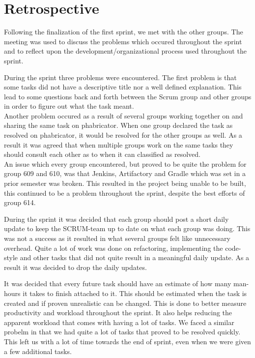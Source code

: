 \section{Retrospective}
Following the finalization of the first sprint, we met with the other
groups. The meeting was used to discuss the problems which occured
throughout the sprint and to reflect upon the development/organizational
process used throughout the sprint.\nl

During the sprint three problems were encountered. The first problem is that
some tasks did not have a descriptive title nor a well defined explanation.
This lead to some questions back and forth between the Scrum group and other
groups in order to figure out what the task meant.\\
Another problem occured as a result of several groups working together on and
sharing the same task on phabricator. When one group declared the task as
resolved on phabricator, it would be resolved for the other groups as well. As
a result it was agreed that when multiple groups work on the same tasks they
should consult each other as to when it can classified as resolved.\\
An issue which every group encountered, but proved to be quite the problem for
group 609 and 610, was that Jenkins, Artifactory and Gradle which was set in a
prior semester was broken. This resulted in the project being unable to be
built, this continued to be a problem throughout the sprint, despite the best
efforts of group 614.\nl

During the sprint it was decided that each group should post a short daily
update to keep the SCRUM-team up to date on what each group was doing. This was
not a success as it resulted in what several groups felt like unnecessary
overhead. Quite a lot of work was done on refactoring, implementing the
code-style and other tasks that did not quite result in a meaningful daily
update. As a result it was decided to drop the daily updates.\nl

It was decided that every future task should have an estimate of how many
man-hours it takes to finish attached to it. This should be estimated when the
task is created and if proven unrealistic can be changed. This is done to
better measure productivity and workload throughout the sprint. It also helps
reducing the apparent workload that comes with having a lot of tasks. We faced a
similar probelm in that we had quite a lot of tasks that proved to be resolved
quickly. This left us with a lot of time towards the end of sprint, even when we
were given a few additional tasks.

